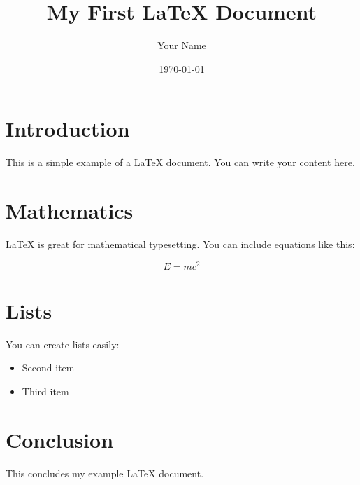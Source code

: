 \documentclass{article}
\title{My First LaTeX Document}
\author{Your Name}
\date{\today}
\begin{document}
\maketitle

\section{Introduction}

This is a simple example of a LaTeX document. You can write your content here.

\section{Mathematics}

LaTeX is great for mathematical typesetting. You can include equations like this:

\[ E = mc^2 \]

\section{Lists}

You can create lists easily:

\begin{itemize}
  \item Second item
  \item Third item
\end{itemize}

\section{Conclusion}

This concludes my example LaTeX document.
\end{document}
